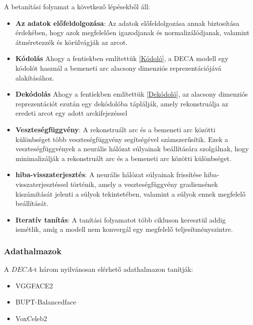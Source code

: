 \documentclass[12pt,a4]{article}
\begin{document}
                A betanítási folyamat a következő lépésekből áll:
                    \begin{itemize}
                        \item \textbf{Az adatok előfeldolgozása}: Az adatok előfeldolgozása annak biztosítása érdekében, hogy azok megfelelően igazodjanak és normalizálódjanak, valamint átméretezzék és körülvágják az arcot.
    
                        \item \textbf{Kódolás} Ahogy a fentiekben említettük \ref{Kódoló}, a DECA modell egy kódolót használ a bemeneti arc alacsony dimenziós reprezentációjává alakításához. 
    
                        \item \textbf{Dekódolás} Ahogy a fentiekben említettük \ref{Dekódoló}, az alacsony dimenziós reprezentációt ezután egy dekódolóba táplálják, amely rekonstruálja az eredeti arcot egy adott arckifejezéssel
    
                        \item \textbf{Veszteségfüggvény}: A rekonstruált arc és a bemeneti arc közötti különbséget több veszteségfüggvény segítségével számszerűsítik. Ezek a veszteségfüggvények a neurális hálózat súlyainak beállítására szolgálnak, hogy minimalizálják a rekonstruált arc és a bemeneti arc közötti különbséget.
    
                        \item \textbf{hiba-visszaterjesztés}: A neurális hálózat súlyainak frissítése hiba-visszaterjesztéssel történik, amely a veszteségfüggvény gradiensének kiszámítását jelenti a súlyok tekintetében, valamint a súlyok ennek megfelelő beállítását.
    
                        \item \textbf{Iteratív tanítás}: A tanítási folyamatot több cikluson keresztül addig ismétlik, amíg a modell nem konvergál egy megfelelő teljesítményszintre.
                    \end{itemize}
                
            \subsubsection{Adathalmazok}
                A $DECA$-t három nyilvánosan elérhető adathalmazon tanítják:
     	              \begin{itemize}
     	            	\item VGGFACE2
     	            	\item BUPT-Balancedface
     	            	\item VoxCeleb2
     	              \end{itemize}
    
\end{document}
